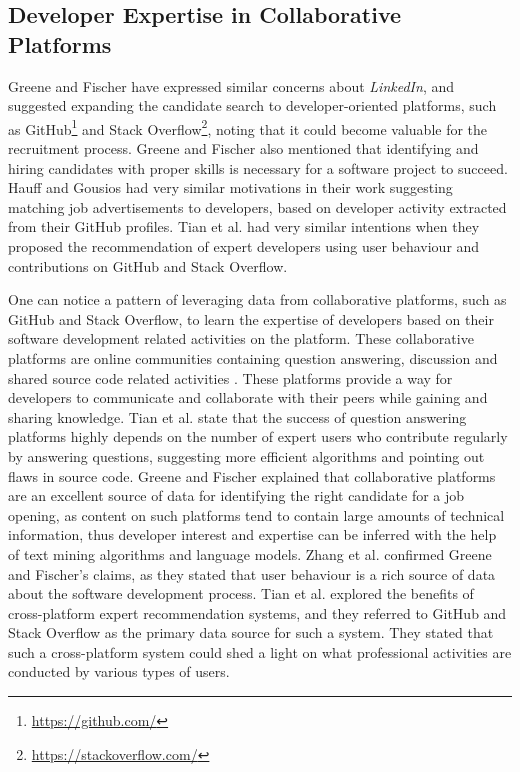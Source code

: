         \subsection{Developer Expertise in Collaborative Platforms}
            Greene and Fischer \cite{greene2016cvexplorer} have expressed similar concerns about \emph{LinkedIn}, and suggested expanding the candidate search to developer-oriented platforms, such as GitHub\footnote{\url{https://github.com/}} and Stack Overflow\footnote{\url{https://stackoverflow.com/}}, noting that it could become valuable for the recruitment process. Greene and Fischer also mentioned that identifying and hiring candidates with proper skills is necessary for a software project to succeed. Hauff and Gousios \cite{hauff2015matching} had very similar motivations in their work suggesting matching job advertisements to developers, based on developer activity extracted from their GitHub profiles. Tian et al. \cite{tian2019geek} had very similar intentions when they proposed the recommendation of expert developers using user behaviour and contributions on GitHub and Stack Overflow.
            
            One can notice a pattern of leveraging data from collaborative platforms, such as GitHub and Stack Overflow, to learn the expertise of developers based on their software development related activities on the platform. These collaborative platforms are online communities containing question answering, discussion and shared source code related activities \cite{wang2018survey}. These platforms provide a way for developers to communicate and collaborate with their peers while gaining and sharing knowledge. Tian et al. \cite{tian2019geek} state that the success of question answering platforms highly depends on the number of expert users who contribute regularly by answering questions, suggesting more efficient algorithms and pointing out flaws in source code. Greene and Fischer \cite{greene2016cvexplorer} explained that collaborative platforms are an excellent source of data for identifying the right candidate for a job opening, as content on such platforms tend to contain large amounts of technical information, thus developer interest and expertise can be inferred with the help of text mining algorithms and language models. Zhang et al. \cite{zhang2014recommending} confirmed Greene and Fischer's claims, as they stated that user behaviour is a rich source of data about the software development process. Tian et al. \cite{tian2019geek} explored the benefits of cross-platform expert recommendation systems, and they referred to GitHub and Stack Overflow as the primary data source for such a system. They stated that such a cross-platform system could shed a light on what professional activities are conducted by various types of users. 
            
